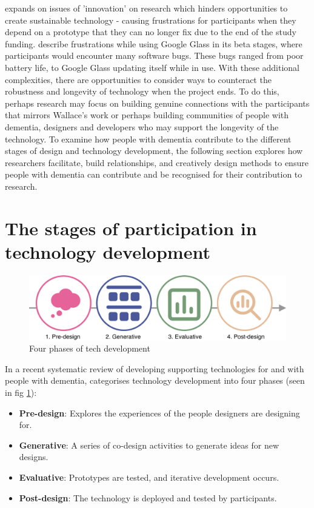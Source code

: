 \cite{meurer_designing_2018} expands on issues of 'innovation' on research which hinders opportunities to create sustainable technology - causing frustrations for participants when they depend on a prototype that they can no longer fix due to the end of the study funding. \cite{vines_our_2017} describe frustrations while using Google Glass in its beta stages, where participants would encounter many software bugs. These bugs ranged from poor battery life, to Google Glass updating itself while in use. With these additional complexities, there are opportunities to consider ways to counteract the robustness and longevity of technology when the project ends. To do this, perhaps research may focus on building genuine connections with the participants that mirrors Wallace's work or perhaps building communities of people with dementia, designers and developers who may support the longevity of the technology. To examine how people with dementia contribute to the different stages of design and technology development, the following section explores how researchers facilitate, build relationships, and creatively design methods to ensure people with dementia can contribute and be recognised for their contribution to research.

\section{The stages of participation in technology development}
\label{BL:StagesofTech}

\begin{figure}[htp]
    \centering
    \includegraphics[width=0.8\linewidth]{Images/ChapterTwo/PhasesOfTech.png}
    \caption{Four phases of tech development \citep{suijkerbuijk_active_2019}}
    \label{fig:PhasesOfTech}
\end{figure}
In a recent systematic review of developing supporting technologies for and with people with dementia, \cite{suijkerbuijk_active_2019} categorises technology development into four phases (seen in fig \ref{fig:PhasesOfTech}):

\begin{itemize}
    \item \textbf{Pre-design}: Explores the experiences of the people designers are designing for.
    \item \textbf{Generative}: A series of co-design activities to generate ideas for new designs.
    \item \textbf{Evaluative}: Prototypes are tested, and iterative development occurs.
    \item \textbf{Post-design}: The technology is deployed and tested by participants.
\end{itemize}

